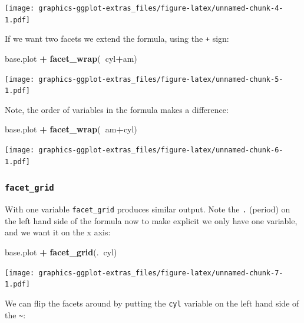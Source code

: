 \documentclass[]{article}
\newenvironment{Shaded}{\begin{snugshade}}{\end{snugshade}}
\newcommand{\KeywordTok}[1]{\textcolor[rgb]{0.13,0.29,0.53}{\textbf{#1}}}
\newcommand{\NormalTok}[1]{#1}
\newcommand{\OperatorTok}[1]{\textcolor[rgb]{0.81,0.36,0.00}{\textbf{#1}}}
\newcommand{\StringTok}[1]{\textcolor[rgb]{0.31,0.60,0.02}{#1}}
\begin{document}
\texttt{[image: graphics-ggplot-extras\_files/figure-latex/unnamed-chunk-4-1.pdf]}

If we want two facets we extend the formula, using the \texttt{+} sign:

\begin{Shaded}
\begin{Highlighting}[]
\NormalTok{base.plot }\OperatorTok{+}\StringTok{ }\KeywordTok{facet_wrap}\NormalTok{(}\OperatorTok{~}\NormalTok{cyl}\OperatorTok{+}\NormalTok{am)}
\end{Highlighting}
\end{Shaded}

\texttt{[image: graphics-ggplot-extras\_files/figure-latex/unnamed-chunk-5-1.pdf]}

Note, the order of variables in the formula makes a difference:

\begin{Shaded}
\begin{Highlighting}[]
\NormalTok{base.plot }\OperatorTok{+}\StringTok{ }\KeywordTok{facet_wrap}\NormalTok{(}\OperatorTok{~}\NormalTok{am}\OperatorTok{+}\NormalTok{cyl)}
\end{Highlighting}
\end{Shaded}

\texttt{[image: graphics-ggplot-extras\_files/figure-latex/unnamed-chunk-6-1.pdf]}

\hypertarget{facet_grid}{%
\subsubsection*{\texorpdfstring{\texttt{facet\_grid}}{facet\_grid}}\label{facet_grid}}

With one variable \texttt{facet\_grid} produces similar output. Note the \texttt{.} (period) on
the left hand side of the formula now to make explicit we only have one
variable, and we want it on the x axis:

\begin{Shaded}
\begin{Highlighting}[]
\NormalTok{base.plot }\OperatorTok{+}\StringTok{ }\KeywordTok{facet_grid}\NormalTok{(.}\OperatorTok{~}\NormalTok{cyl)}
\end{Highlighting}
\end{Shaded}

\texttt{[image: graphics-ggplot-extras\_files/figure-latex/unnamed-chunk-7-1.pdf]}

We can flip the facets around by putting the \texttt{cyl} variable on the left hand
side of the \texttt{\textasciitilde{}}:
\end{document}
